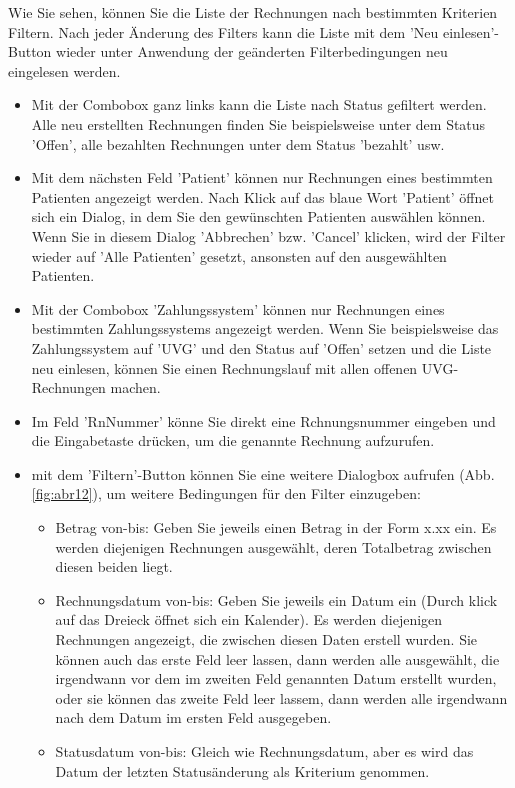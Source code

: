 \documentclass[a4paper]{scrartcl}
\begin{document}
Wie Sie sehen, können Sie die Liste der Rechnungen nach bestimmten Kriterien Filtern. Nach jeder Änderung des Filters kann die Liste mit dem 'Neu einlesen'-Button wieder unter Anwendung der geänderten Filterbedingungen neu eingelesen werden.

\begin{itemize}

\item Mit der Combobox ganz links kann die Liste nach Status gefiltert werden. Alle neu erstellten Rechnungen finden Sie beispielsweise unter dem Status 'Offen', alle bezahlten Rechnungen unter dem Status 'bezahlt' usw.

\item Mit dem nächsten Feld 'Patient' können nur Rechnungen eines bestimmten Patienten angezeigt werden. Nach Klick auf das blaue Wort 'Patient' öffnet sich ein Dialog, in dem Sie den gewünschten Patienten auswählen können. Wenn Sie in diesem Dialog 'Abbrechen' bzw. 'Cancel' klicken, wird der Filter wieder auf 'Alle Patienten' gesetzt, ansonsten auf den ausgewählten Patienten.

\item Mit der Combobox 'Zahlungssystem' können nur Rechnungen eines bestimmten Zahlungssystems angezeigt werden. Wenn Sie beispielsweise das Zahlungssystem auf 'UVG' und den Status auf 'Offen' setzen und die Liste neu einlesen, können Sie einen Rechnungslauf mit allen offenen UVG-Rechnungen machen.

\item Im Feld 'RnNummer' könne Sie direkt eine Rchnungsnummer eingeben und die Eingabetaste drücken, um die genannte Rechnung aufzurufen.

\item mit dem 'Filtern'-Button können Sie eine weitere Dialogbox aufrufen (Abb.\ref{fig:abr12}), um weitere  Bedingungen für den Filter einzugeben:
    \begin{itemize}
    \item Betrag von-bis: Geben Sie jeweils einen Betrag in der Form x.xx ein. Es werden diejenigen Rechnungen ausgewählt, deren Totalbetrag zwischen diesen beiden liegt.
    \item Rechnungsdatum von-bis: Geben Sie jeweils ein Datum ein (Durch klick auf das Dreieck öffnet sich ein Kalender). Es werden diejenigen Rechnungen angezeigt, die zwischen diesen Daten erstell wurden. Sie können auch das erste Feld leer lassen, dann werden alle ausgewählt, die irgendwann vor dem im zweiten Feld genannten Datum erstellt wurden, oder sie können das zweite Feld leer lassem, dann werden alle irgendwann nach dem Datum im ersten Feld ausgegeben.
    \item Statusdatum von-bis: Gleich wie Rechnungsdatum, aber es wird das Datum der letzten Statusänderung als Kriterium genommen.
    \end{itemize}
    
\end{itemize}
\end{document}

